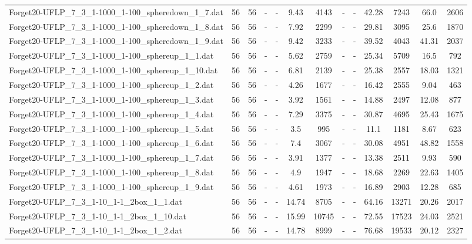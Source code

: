 \begin{table}[!ht]
{\begin{tabular}{lcccccccccccc}
Forget20-UFLP\_7\_3\_1-1000\_1-100\_spheredown\_1\_7.dat & 56 & 56 &  - &  - & 9.43 & 4143 &  - &  - & 42.28 & 7243 & 66.0 & 2606 \\
Forget20-UFLP\_7\_3\_1-1000\_1-100\_spheredown\_1\_8.dat & 56 & 56 &  - &  - & 7.92 & 2299 &  - &  - & 29.81 & 3095 & 25.6 & 1870 \\
Forget20-UFLP\_7\_3\_1-1000\_1-100\_spheredown\_1\_9.dat & 56 & 56 &  - &  - & 9.42 & 3233 &  - &  - & 39.52 & 4043 & 41.31 & 2037 \\
Forget20-UFLP\_7\_3\_1-1000\_1-100\_sphereup\_1\_1.dat & 56 & 56 &  - &  - & 5.62 & 2759 &  - &  - & 25.34 & 5709 & 16.5 & 792 \\
Forget20-UFLP\_7\_3\_1-1000\_1-100\_sphereup\_1\_10.dat & 56 & 56 &  - &  - & 6.81 & 2139 &  - &  - & 25.38 & 2557 & 18.03 & 1321 \\
Forget20-UFLP\_7\_3\_1-1000\_1-100\_sphereup\_1\_2.dat & 56 & 56 &  - &  - & 4.26 & 1677 &  - &  - & 16.42 & 2555 & 9.04 & 463 \\
Forget20-UFLP\_7\_3\_1-1000\_1-100\_sphereup\_1\_3.dat & 56 & 56 &  - &  - & 3.92 & 1561 &  - &  - & 14.88 & 2497 & 12.08 & 877 \\
Forget20-UFLP\_7\_3\_1-1000\_1-100\_sphereup\_1\_4.dat & 56 & 56 &  - &  - & 7.29 & 3375 &  - &  - & 30.87 & 4695 & 25.43 & 1675 \\
Forget20-UFLP\_7\_3\_1-1000\_1-100\_sphereup\_1\_5.dat & 56 & 56 &  - &  - & 3.5 & 995 &  - &  - & 11.1 & 1181 & 8.67 & 623 \\
Forget20-UFLP\_7\_3\_1-1000\_1-100\_sphereup\_1\_6.dat & 56 & 56 &  - &  - & 7.4 & 3067 &  - &  - & 30.08 & 4951 & 48.82 & 1558 \\
Forget20-UFLP\_7\_3\_1-1000\_1-100\_sphereup\_1\_7.dat & 56 & 56 &  - &  - & 3.91 & 1377 &  - &  - & 13.38 & 2511 & 9.93 & 590 \\
Forget20-UFLP\_7\_3\_1-1000\_1-100\_sphereup\_1\_8.dat & 56 & 56 &  - &  - & 4.9 & 1947 &  - &  - & 18.68 & 2269 & 22.63 & 1405 \\
Forget20-UFLP\_7\_3\_1-1000\_1-100\_sphereup\_1\_9.dat & 56 & 56 &  - &  - & 4.61 & 1973 &  - &  - & 16.89 & 2903 & 12.28 & 685 \\
Forget20-UFLP\_7\_3\_1-10\_1-1\_2box\_1\_1.dat & 56 & 56 &  - &  - & 14.74 & 8705 &  - &  - & 64.16 & 13271 & 20.26 & 2017 \\
Forget20-UFLP\_7\_3\_1-10\_1-1\_2box\_1\_10.dat & 56 & 56 &  - &  - & 15.99 & 10745 &  - &  - & 72.55 & 17523 & 24.03 & 2521 \\
Forget20-UFLP\_7\_3\_1-10\_1-1\_2box\_1\_2.dat & 56 & 56 &  - &  - & 14.78 & 8999 &  - &  - & 76.68 & 19533 & 20.12 & 2327 \\

\end{tabular}}
\end{table}
